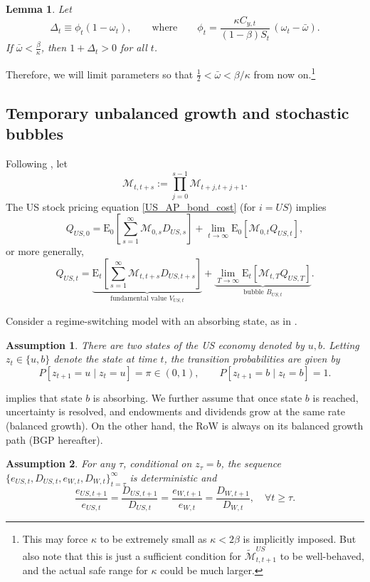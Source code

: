 \documentclass[12pt]{article}
\theoremstyle{plain}
\newtheorem{ass}{Assumption}
\newtheorem{lem}{Lemma}
\begin{document}
\begin{lem}\label{lem1}
Let
\[
\Delta_t \equiv \phi_t(1-\omega_t),
\qquad\text{where}\qquad
\phi_t=\frac{\kappa C_{y,t}}{(1-\beta)S_t}\,(\omega_t-\bar\omega).
\]
If $\bar\omega < \frac{\beta}{\kappa}$,
then $1+\Delta_t>0$ for all $t$.
\end{lem}

Therefore, we will limit parameters so that $\frac{1}{2}<\bar\omega<\beta/\kappa$ from now on.\footnote{
	This may force $\kappa$ to be extremely small as $\kappa <2 \beta$ is implicitly imposed. 
	But also note that this is just a sufficient condition for $\mathcal{\tilde M}^{US}_{t,t+1}$ 
	to be well-behaved, and the actual safe range for $\kappa$ could be much larger.}

\subsection{Temporary unbalanced growth and stochastic bubbles}

Following \citet{hirano2025technological}, let
\[
\mathcal{M}_{t,t+s}:=\prod_{j=0}^{s-1} \mathcal{M}_{t+j,t+j+1}.
\]
The US stock pricing equation \eqref{US_AP_bond_cost} (for $i=US$) implies
\[
Q_{US,0}=
\mathrm{E}_0 \left[\sum_{s=1}^{\infty} \mathcal{M}_{0,s} D_{US,s}\right]
+\lim_{t \rightarrow \infty} \mathrm{E}_0\left[\mathcal{M}_{0,t} Q_{US,t}\right],
\]
or more generally,
\[
Q_{US,t}=
\underbrace{\mathrm{E}_t \left[ \sum_{s=1}^{\infty} \mathcal{M}_{t,t+s} D_{US,t+s}\right]}_{\text{fundamental value }V_{US,t}}
+\underbrace{\lim_{T \rightarrow \infty} \mathrm{E}_t\left[\mathcal{M}_{t,T} Q_{US,T}\right]}_{\text{bubble }B_{US,t}}.
\]

Consider a regime-switching model with an absorbing state, as in \citet{weil1987confidence}.

\begin{ass}\label{ass1}
There are two states of the US economy denoted by $u, b$. Letting $z_t \in \{u, b\}$ denote the state at time $t$,
the transition probabilities are given by
\[
P[z_{t+1} = u \mid z_t = u] = \pi \in (0,1), \qquad P[z_{t+1} = b \mid z_t = b] = 1.
\]
\end{ass}

 implies that state $b$ is absorbing. We further assume that once state $b$ is reached, uncertainty is resolved,
and endowments and dividends grow at the same rate (balanced growth). On the other hand, the RoW is always on its balanced growth path (BGP hereafter).

\begin{ass}\label{ass2}
For any $\tau$, conditional on $z_\tau = b$, the sequence
$\{e_{US,t}, D_{US,t}, e_{W,t}, D_{W,t}\}_{t=\tau}^\infty$ is deterministic and
\[
\frac{e_{US,t+1}}{e_{US, t}} =
\frac{D_{US, t+1}}{D_{US,t}}=
\frac{e_{W,t+1}}{e_{W, t}} =
\frac{D_{W, t+1}}{D_{W,t}} ,\quad \forall t \geq \tau.
\]
\end{ass}
\end{document}
